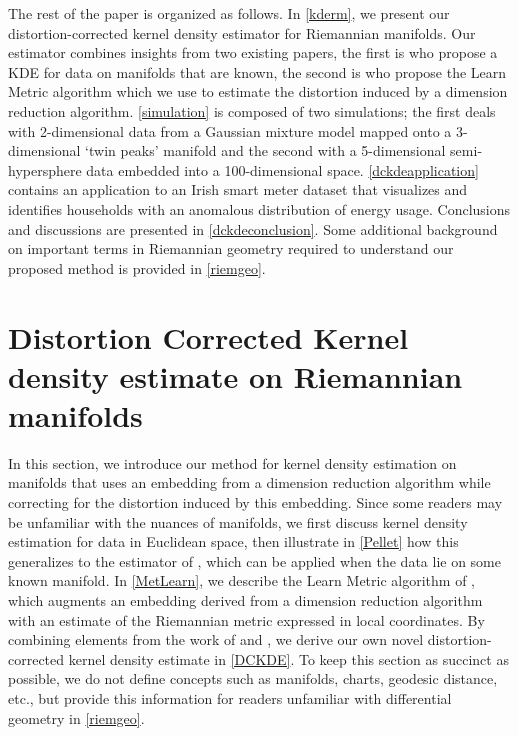 \documentclass[12pt]{article}
\begin{document}
The rest of the paper is organized as follows. In \autoref{kderm}, we present our distortion-corrected kernel density estimator for Riemannian manifolds. Our estimator combines insights from two existing papers, the first is \textcite{Pelletier2005-vu} who propose a KDE for data on manifolds that are known, the second is \textcite{Perrault-Joncas2013-pq} who propose the Learn Metric algorithm which we use to estimate the distortion induced by a dimension reduction algorithm. \autoref{simulation} is composed of two simulations; the first deals with 2-dimensional data from a Gaussian mixture model mapped onto a 3-dimensional `twin peaks' manifold and the second with a 5-dimensional semi-hypersphere data embedded into a 100-dimensional space. \autoref{dckdeapplication} contains an application to an Irish smart meter dataset that visualizes and identifies households with an anomalous distribution of energy usage. Conclusions and discussions are presented in \autoref{dckdeconclusion}. Some additional background on important terms in Riemannian geometry required to understand our proposed method is provided in \autoref{riemgeo}.

\hypertarget{kderm}{%
\section{Distortion Corrected Kernel density estimate on Riemannian manifolds}\label{kderm}}

In this section, we introduce our method for kernel density estimation on manifolds that uses an embedding from a dimension reduction algorithm while correcting for the distortion induced by this embedding. Since some readers may be unfamiliar with the nuances of manifolds, we first discuss kernel density estimation for data in Euclidean space, then illustrate in \autoref{Pellet} how this generalizes to the estimator of \textcite{Pelletier2005-vu}, which can be applied when the data lie on some known manifold. In \autoref{MetLearn}, we describe the Learn Metric algorithm of \textcite{Perrault-Joncas2013-pq}, which augments an embedding derived from a dimension reduction algorithm with an estimate of the Riemannian metric expressed in local coordinates. By combining elements from the work of \textcite{Pelletier2005-vu} and \textcite{Perrault-Joncas2013-pq}, we derive our own novel distortion-corrected kernel density estimate in \autoref{DCKDE}. To keep this section as succinct as possible, we do not define concepts such as manifolds, charts, geodesic distance, etc., but provide this information for readers unfamiliar with differential geometry in \autoref{riemgeo}.
\end{document}
